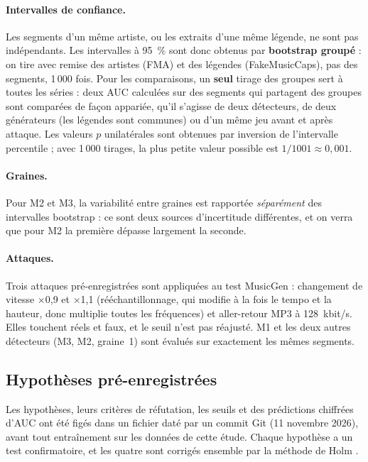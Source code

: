 \documentclass[a4paper, 11pt]{article}
\begin{document}
\paragraph{Intervalles de confiance.} Les segments d'un même artiste, ou les extraits d'une même légende,
ne sont pas indépendants. Les intervalles à 95~\% sont donc obtenus par \textbf{bootstrap groupé}
\cite{efron1993bootstrap} : on tire avec remise des artistes (FMA) et des légendes (FakeMusicCaps), pas des
segments, 1\,000 fois. Pour les comparaisons, un \textbf{seul} tirage des groupes sert à toutes les séries :
deux AUC calculées sur des segments qui partagent des groupes sont comparées de façon appariée, qu'il
s'agisse de deux détecteurs, de deux générateurs (les légendes sont communes) ou d'un même jeu avant et
après attaque. Les valeurs $p$ unilatérales sont obtenues par inversion de l'intervalle percentile ; avec
1\,000 tirages, la plus petite valeur possible est $1/1001 \approx 0{,}001$.

\paragraph{Graines.} Pour M2 et M3, la variabilité entre graines est rapportée \emph{séparément} des
intervalles bootstrap : ce sont deux sources d'incertitude différentes, et on verra que pour M2 la première
dépasse largement la seconde.

\paragraph{Attaques.} Trois attaques pré-enregistrées sont appliquées au test MusicGen : changement de
vitesse $\times$0,9 et $\times$1,1 (rééchantillonnage, qui modifie à la fois le tempo et la hauteur, donc
multiplie toutes les fréquences) et aller-retour MP3 à 128~kbit/s. Elles touchent réels et faux, et le
seuil n'est pas réajusté. M1 et les deux autres détecteurs (M3, M2, graine~1) sont évalués sur exactement
les mêmes segments.

\subsection{Hypothèses pré-enregistrées}
\label{sec:prereg}

Les hypothèses, leurs critères de réfutation, les seuils et des prédictions chiffrées d'AUC ont été figés
dans un fichier daté par un commit Git (11 novembre 2026), avant tout entraînement sur les données de cette
étude. Chaque hypothèse a un test confirmatoire, et les quatre sont corrigés ensemble par la méthode de Holm
\cite{holm1979}.
\end{document}
